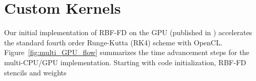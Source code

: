 \documentclass{report}
\begin{document}


\section{Custom Kernels}
\label{sec:custom_gpu_kernels}
 
%
%



Our initial implementation of RBF-FD on the GPU (published in \cite{BolligFlyerErlebacher2012}) accelerates the standard fourth order Runge-Kutta (RK4) scheme with OpenCL. Figure~\ref{fig:multi_GPU_flow} summarizes the time advancement steps for the multi-CPU/GPU implementation. Starting with code initialization, RBF-FD stencils and weights 
\end{document}
